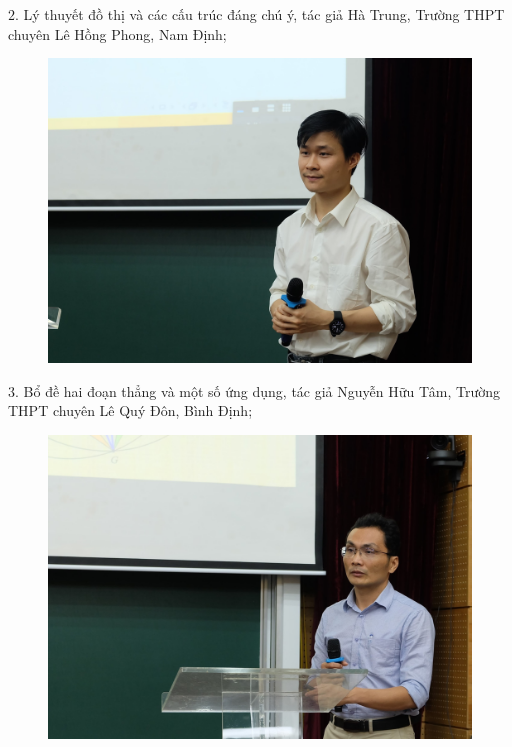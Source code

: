\begin{multicols}{2}
\begin{figure}[H]
		\vspace*{-10pt}
	\end{figure}
	$2$. Lý thuyết đồ thị và các cấu trúc đáng chú ý, tác giả Hà Trung, Trường THPT chuyên Lê Hồng Phong, Nam Định; 
	\begin{figure}[H]
		\vspace*{5pt}
		\centering
		\captionsetup{labelformat= empty, justification=centering}
		\includegraphics[width= 1\linewidth]{3}
		\vspace*{-15pt}
	\end{figure}
	$3$. Bổ đề hai đoạn thẳng và một số ứng dụng, tác giả Nguyễn Hữu Tâm, Trường THPT chuyên Lê Quý Đôn, Bình Định; 
	\begin{figure}[H]
		\vspace*{-5pt}
		\centering
		\captionsetup{labelformat= empty, justification=centering}
		\includegraphics[width= 1\linewidth]{4}

\end{figure}
\end{multicols}
